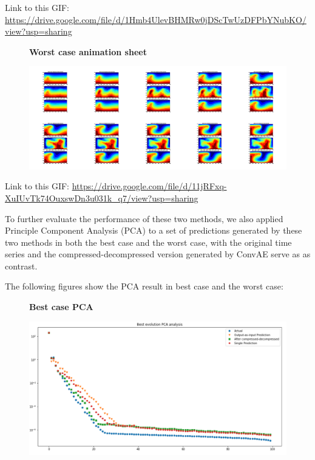 Link to this GIF: \url{https://drive.google.com/file/d/1Hmb4UlevBHMRw0jDScTwUzDFPbYNubKO/view?usp=sharing}

\begin{figure}[H]
    \centering
    \textbf{Worst case animation sheet}\par\medskip
    \includegraphics[scale=0.10]{Report LaTeX/figures/mantle_convection_images/Worst_case_GIF_sheet_FNN.png}
\end{figure}

Link to this GIF: 
\url{https://drive.google.com/file/d/11jRFxq-XuIUvTk74OuxswDn3u031k_q7/view?usp=sharing}

To further evaluate the performance of these two methods, we also applied Principle Component Analysis (PCA) to a set of predictions generated by these two methods in both the best case and the worst case, with the original time series and the compressed-decompressed version generated by ConvAE serve as as contrast.

The following figures show the PCA result in best case and the worst case:

\begin{figure}[H]
    \textbf{Best case PCA}\par\medskip
    \includegraphics[scale=0.5]{Report LaTeX/figures/mantle_convection_images/Best_case_PCA_FNN.png}
\end{figure}

